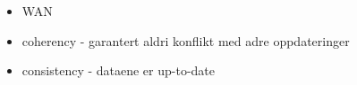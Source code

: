 









\begin{itemize}
	\item \cite{Breslow2004} WAN
	\item coherency - garantert aldri konflikt med adre oppdateringer
	\item consistency - dataene er up-to-date
\end{itemize}





